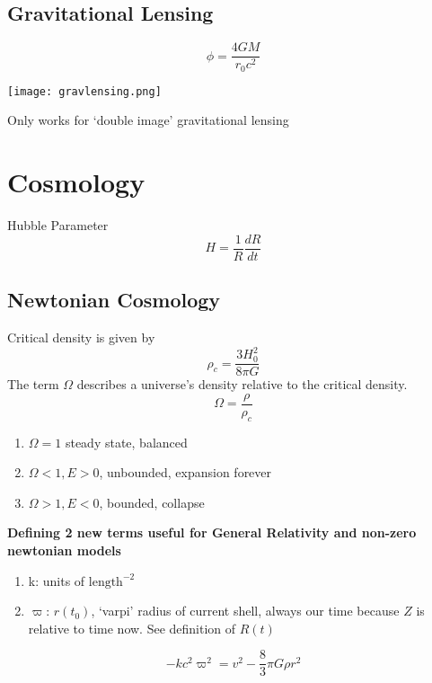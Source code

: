 \subsection{Gravitational Lensing}
\begin{equation}
	\label{}
	\phi=\frac{4GM}{r_{0}c^{2}}
\end{equation}

\texttt{[image: gravlensing.png]}


Only works for `double image' gravitational lensing


\section{Cosmology}

Hubble Parameter
\begin{equation}
	\label{}
	H=\frac{1}{R}\frac{dR}{dt}
\end{equation}

\subsection{Newtonian Cosmology}


Critical density is given by
\begin{equation}
	\label{}
	\rho_{c}=\frac{3H_{0}^{2}}{8\pi G}
\end{equation}
The term $\Omega$ describes a universe's density relative to the critical density. 
\begin{equation}
	\label{}
	\Omega=\frac{\rho}{\rho_{c}}
\end{equation}
\begin{enumerate}
	\item $\Omega=1$ steady state, balanced	
	\item $\Omega<1, E>0$, unbounded, expansion forever
	\item $\Omega>1, E<0$, bounded, collapse
\end{enumerate}

\textbf{Defining 2 new terms useful for General Relativity and non-zero newtonian models}
\begin{enumerate}
	\item k: units of $\mbox{length}^{-2}$
	\item $\varpi$: $r(t_{0})$, `varpi' radius of current shell, always our time because $Z$ is relative to time now. See definition of $R(t)$ 
\end{enumerate}

\begin{equation}
	\label{}
	-kc^{2}\varpi^{2}=v^{2}-\frac{8}{3}\pi G\rho r^{2}
\end{equation}

